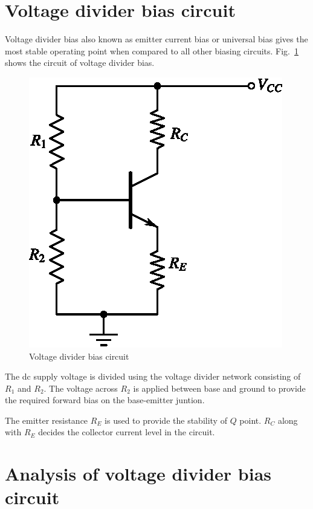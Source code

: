 \section{Voltage divider bias circuit}\label{sec4.6}

Voltage divider bias also known as emitter current bias or universal bias gives the most stable operating point when compared to all other biasing circuits. Fig.~\ref{fig4.11} shows the circuit of voltage divider bias.
\begin{figure}[H]
\centering
\includegraphics{chap3/fig3.11.eps}
\caption{Voltage divider bias circuit}\label{fig4.11}
\end{figure}

The dc supply voltage is divided using the voltage divider network consisting of $R_{1}$ and $R_{2}$. The voltage across $R_{2}$ is applied between base and ground to provide the required forward bias on the base-emitter juntion.

The emitter resistance $R_{E}$ is used to provide the stability of $Q$ point. $R_{C}$ along with $R_{E}$ decides the collector current level in the circuit.

\section{Analysis of voltage divider bias circuit}\label{sec4.7}

